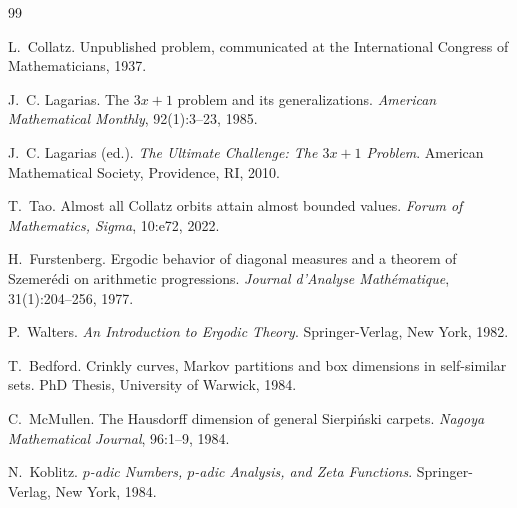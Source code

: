 \documentclass[12pt,a4paper]{article}
\begin{document}
\begin{thebibliography}{99}

L.~Collatz.
\newblock Unpublished problem, communicated at the International Congress of Mathematicians, 1937.

J.~C. Lagarias.
\newblock The $3x+1$ problem and its generalizations.
\newblock \emph{American Mathematical Monthly}, 92(1):3--23, 1985.

J.~C. Lagarias (ed.).
\newblock \emph{The Ultimate Challenge: The $3x+1$ Problem}.
\newblock American Mathematical Society, Providence, RI, 2010.

T.~Tao.
\newblock Almost all Collatz orbits attain almost bounded values.
\newblock \emph{Forum of Mathematics, Sigma}, 10:e72, 2022.

H.~Furstenberg.
\newblock Ergodic behavior of diagonal measures and a theorem of Szemer\'edi on arithmetic progressions.
\newblock \emph{Journal d'Analyse Math\'ematique}, 31(1):204--256, 1977.

P.~Walters.
\newblock \emph{An Introduction to Ergodic Theory}.
\newblock Springer-Verlag, New York, 1982.

T.~Bedford.
\newblock Crinkly curves, Markov partitions and box dimensions in self-similar sets.
\newblock PhD Thesis, University of Warwick, 1984.

C.~McMullen.
\newblock The Hausdorff dimension of general Sierpi\'nski carpets.
\newblock \emph{Nagoya Mathematical Journal}, 96:1--9, 1984.

N.~Koblitz.
\newblock \emph{$p$-adic Numbers, $p$-adic Analysis, and Zeta Functions}.
\newblock Springer-Verlag, New York, 1984.

\end{thebibliography}
\end{document}
